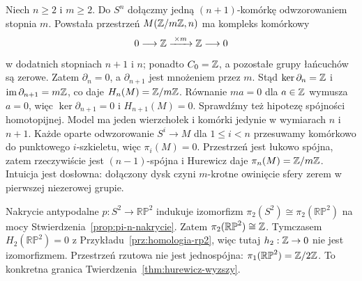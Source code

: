\begin{przyklad}
\label{prz:moore-hurewicz}
Niech $n\geq2$ i $m\geq2$.
Do $S^n$ dołączmy
jedną $(n+1)$-komórkę
odwzorowaniem stopnia $m$.
Powstała przestrzeń
$M(\mathbb{Z}/m\mathbb{Z},n)$ ma
kompleks komórkowy
\[
 0\longrightarrow\mathbb{Z}
 \xrightarrow{\;\times m\;}\mathbb{Z}
 \longrightarrow0
\]
w dodatnich stopniach $n+1$ i $n$; ponadto $C_0=\mathbb{Z}$,
a pozostałe grupy łańcuchów są zerowe. Zatem
$\partial_n=0$, a $\partial_{n+1}$ jest mnożeniem przez $m$.
Stąd $\ker\partial_n=\mathbb{Z}$ i $\operatorname{im}\partial_{n+1}=m\mathbb{Z}$,
co daje $H_n(M)=\mathbb{Z}/m\mathbb{Z}$.
Równanie $m a=0$ dla $a\in\mathbb{Z}$ wymusza $a=0$,
więc $\ker\partial_{n+1}=0$ i $H_{n+1}(M)=0$.
Sprawdźmy też hipotezę spójności homotopijnej.
Model ma jeden wierzchołek i komórki jedynie w wymiarach $n$ i $n+1$.
Każde oparte odwzorowanie $S^i\to M$ dla $1\leq i<n$
przesuwamy komórkowo do punktowego $i$-szkieletu, więc
$\pi_i(M)=0$. Przestrzeń jest łukowo spójna, zatem rzeczywiście
jest $(n-1)$-spójna i Hurewicz daje $\pi_n(M)=\mathbb{Z}/m\mathbb{Z}$.
Intuicja jest
dosłowna: dołączony
dysk czyni
$m$-krotne
owinięcie sfery
zerem w pierwszej
niezerowej grupie.
\end{przyklad}

\begin{przyklad}
\label{prz:rp2-pi2}
Nakrycie antypodalne
$p:S^2\to\mathbb{RP}^2$
indukuje izomorfizm
$\pi_2(S^2)\cong
\pi_2(\mathbb{RP}^2)$
na mocy
Stwierdzenia~\ref{prop:pi-n-nakrycie}.
Zatem
$\pi_2(\mathbb{RP}^2)\cong\mathbb{Z}$.
Tymczasem
$H_2(\mathbb{RP}^2)=0$
z Przykładu~\ref{prz:homologia-rp2},
więc tutaj
$h_2:\mathbb{Z}\to0$
nie jest izomorfizmem.
Przestrzeń rzutowa
nie jest jednospójna:
$\pi_1(\mathbb{RP}^2)=\mathbb{Z}/2\mathbb{Z}$.
To konkretna granica
Twierdzenia~\ref{thm:hurewicz-wyzszy}.
\end{przyklad}

